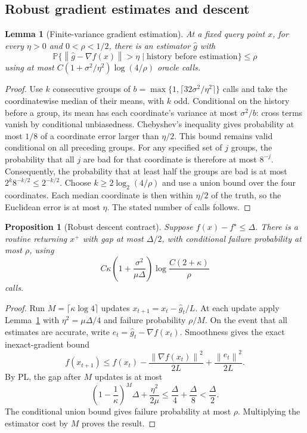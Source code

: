 \documentclass[11pt,a4paper]{article}
\newcommand{\Prb}{\mathbb P}
\newcommand{\norm}[1]{\left\lVert #1\right\rVert}
\newtheorem{lemma}[theorem]{Lemma}
\newtheorem{proposition}[theorem]{Proposition}
\theoremstyle{definition}
\theoremstyle{remark}
\begin{document}
\subsection{Robust gradient estimates and descent}

\begin{lemma}[Finite-variance gradient estimation]
\label{lem:robust-mean}
At a fixed query point $x$, for every $\eta>0$ and
$0<\rho<1/2$, there is an estimator $\widehat g$ with
\[
 \Prb\{\norm{\widehat g-\nabla f(x)}>\eta
       \mid\text{history before estimation}\}\le\rho
\]
using at most
$C(1+\sigma^2/\eta^2)\log(4/\rho)$ oracle calls.
\end{lemma}

\begin{proof}
Use $k$ consecutive groups of
$b=\max\{1,\lceil32\sigma^2/\eta^2\rceil\}$ calls and take the
coordinatewise median of their means, with $k$ odd.
Conditional on the history before a group, its mean has each
coordinate's variance at most $\sigma^2/b$: cross terms vanish by
conditional unbiasedness.  Chebyshev's inequality gives probability
at most $1/8$ of a coordinate error larger than $\eta/2$.
This bound remains valid conditional on all preceding groups.
For any specified set of $j$ groups, the probability that all
$j$ are bad for that coordinate is therefore at most $8^{-j}$.
Consequently, the probability that at least half the groups are bad
is at most $2^k8^{-k/2}\le2^{-k/2}$.
Choose $k\ge2\log_2(4/\rho)$ and use a union bound over the four
coordinates.  Each median coordinate is then within $\eta/2$ of
the truth, so the Euclidean error is at most $\eta$.
The stated number of calls follows.
\end{proof}

\begin{proposition}[Robust descent contract]
\label{prop:descent-contract}
Suppose $f(x)-f^\star\le\Delta$.  There is a routine returning $x^+$
with gap at most $\Delta/2$, with conditional failure probability
at most $\rho$, using
\[
 C\kappa\left(1+\frac{\sigma^2}{\mu\Delta}\right)
 \log\frac{C(2+\kappa)}{\rho}
\]
calls.
\end{proposition}

\begin{proof}
Run $M=\lceil\kappa\log4\rceil$ updates
$x_{t+1}=x_t-\widehat g_t/L$.  At each update apply
Lemma~\ref{lem:robust-mean} with
$\eta^2=\mu\Delta/4$ and failure probability $\rho/M$.
On the event that all estimates are accurate, write
$e_t=\widehat g_t-\nabla f(x_t)$.  Smoothness gives the exact
inexact-gradient bound
\[
 f(x_{t+1})\le f(x_t)
       -\frac{\norm{\nabla f(x_t)}^2}{2L}
       +\frac{\norm{e_t}^2}{2L}.
\]
By PL, the gap after $M$ updates is at most
\[
 \left(1-\frac1\kappa\right)^M\Delta+
 \frac{\eta^2}{2\mu}
 \le\frac{\Delta}{4}+\frac{\Delta}{8}
 <\frac{\Delta}{2}.
\]
The conditional union bound gives failure probability at most
$\rho$.  Multiplying the estimator cost by $M$ proves the result.
\end{proof}
\end{document}

